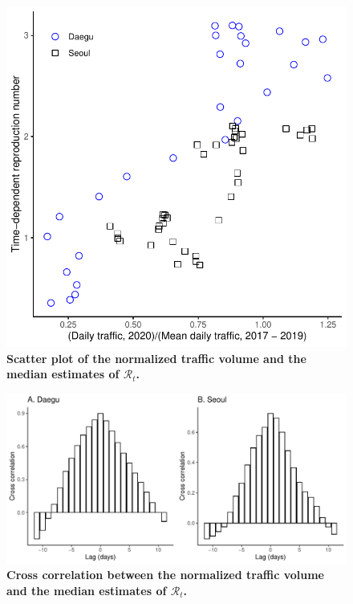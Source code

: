 \begin{figure}[!ht]
\includegraphics[width=\textwidth]{traffic.pdf}
\caption{
\textbf{Scatter plot of the normalized traffic volume and the median estimates of $\mathcal R_t$.}
}
\end{figure}

\pagebreak

\begin{figure}[!ht]
\includegraphics[width=\textwidth]{figure_cross.pdf}
\caption{
\textbf{Cross correlation between the normalized traffic volume and the median estimates of $\mathcal R_t$.}
}
\end{figure}

\pagebreak

